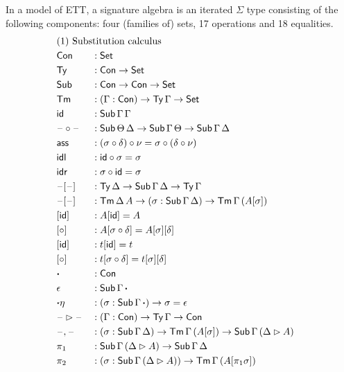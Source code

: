 \documentclass[a4paper,UKenglish,cleveref, autoref]{lipics-v2019}
\begin{document}
\begin{definition}\label{def:algebra}
  In a model of ETT, a signature algebra is an iterated $\Sigma$ type
  consisting of the following components: four (families of) sets, 17
  operations and 18 equalities.
\begin{alignat*}{5}
  & \rlap{(1) Substitution calculus} \\
  & \Con && : \Set \\
  & \Ty  && : \Con\ra\Set \\
  & \Sub  && : \Con\ra\Con\ra\Set \\
  & \Tm  && : (\Gamma:\Con)\ra\Ty\,\Gamma\ra\Set \\
  & \id && : \Sub\,\Gamma\,\Gamma \\
  & \blank\circ\blank && : \Sub\,\Theta\,\Delta\ra\Sub\,\Gamma\,\Theta\ra\Sub\,\Gamma\,\Delta \\
  & \ass && : (\sigma \circ \delta) \circ \nu = \sigma \circ (\delta \circ \nu) \\
  & \idl && : \id\circ\sigma = \sigma \\
  & \idr && : \sigma\circ\id = \sigma \\
  & \blank[\blank] && : \Ty\,\Delta\ra\Sub\,\Gamma\,\Delta\ra\Ty\,\Gamma \\
  & \blank[\blank] && : \Tm\,\Delta\,A\ra(\sigma:\Sub\,\Gamma\,\Delta)\ra\Tm\,\Gamma\,(A[\sigma]) \\
  & [\id] && : A[\id] = A \\
  & [\circ] && : A[\sigma \circ \delta] = A[\sigma][\delta] \\
  & [\id] && : t[\id] = t \\
  & [\circ] && : t[\sigma \circ \delta] = t[\sigma][\delta] \\
  & \boldsymbol{\cdot} && : \Con \\
  & \epsilon && : \Sub\,\Gamma\,\boldsymbol{\cdot} \\
  & {\boldsymbol{\cdot}\eta} && : (\sigma : \Sub\,\Gamma\,\boldsymbol{\cdot}) \ra \sigma = \epsilon \\
  & \blank\ext\blank && : (\Gamma:\Con)\ra\Ty\,\Gamma\ra\Con \\
  & \blank,\blank && : (\sigma:\Sub\,\Gamma\,\Delta)\ra\Tm\,\Gamma\,(A[\sigma])\ra\Sub\,\Gamma\,(\Delta\ext A) \\
  & \pi_1 && : \Sub\,\Gamma\,(\Delta\ext A)\ra \Sub\,\Gamma\,\Delta \\
  & \pi_2 && : (\sigma : \Sub\,\Gamma\,(\Delta\ext A))\ra \Tm\,\Gamma\,(A[\pi_1 \sigma]) \\

\end{alignat*}
\end{definition}
\end{document}
